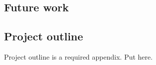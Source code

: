        \subsection{Future work}
    
    \printbibliography[title={References},heading=bibintoc] %
    
    
    
    \begin{uomappendix} 
        \section{Project outline}
    
            \begin{temp}
                Project outline is a required appendix. Put here.
            \end{temp}
            
            
            

\end{uomappendix}
